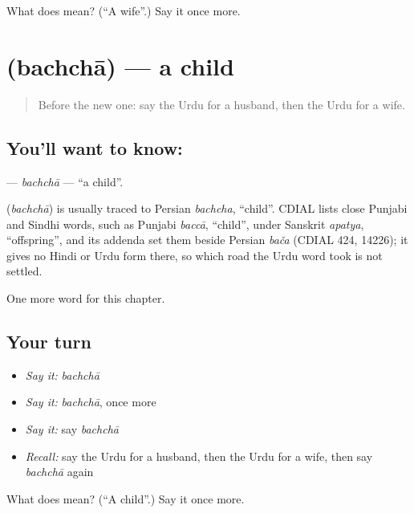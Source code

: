 \begin{tcolorbox}[breakable,colback=teal!4,colframe=teal!35!black,title={Before you move on}]
What does  mean? (\textquotedblleft{}A wife\textquotedblright{}.) Say it once more.
\end{tcolorbox}
\section[\texorpdfstring{\ur{بچہ} (bachchā)}{بچہ (bachchā)}]{ (bachchā) — a child}

\label{lesson:UR-C44-bachcha}



\begin{quote}
Before the new one: say the Urdu for a husband, then the Urdu for a wife.
\end{quote}

\subsection*{You'll want to know: }
\textbf{} — \emph{bachchā} — \textquotedblleft{}a child\textquotedblright{}.

\begin{cousinweb}
\textbf{} (\emph{bachchā}) is usually traced to Persian \emph{bachcha}, \textquotedblleft{}child\textquotedblright{}. CDIAL lists close Punjabi and Sindhi words, such as Punjabi \emph{baccā}, \textquotedblleft{}child\textquotedblright{}, under Sanskrit \emph{apatya}, \textquotedblleft{}offspring\textquotedblright{}, and its addenda set them beside Persian \emph{bača} (CDIAL 424, 14226); it gives no Hindi or Urdu form there, so which road the Urdu word took is not settled.
\end{cousinweb}

\begin{grammarlens}[title={What you've built}]
One more word for this chapter.
\end{grammarlens}

\subsection*{Your turn}
\begin{itemize}
\raggedright
  \item \emph{Say it:} \emph{bachchā}
  \item \emph{Say it:} \emph{bachchā}, once more
  \item \emph{Say it:} say \emph{bachchā}
  \item \emph{Recall:} say the Urdu for a husband, then the Urdu for a wife, then say \emph{bachchā} again
\end{itemize}

\begin{tcolorbox}[breakable,colback=teal!4,colframe=teal!35!black,title={Before you move on}]
What does  mean? (\textquotedblleft{}A child\textquotedblright{}.) Say it once more.
\end{tcolorbox}
